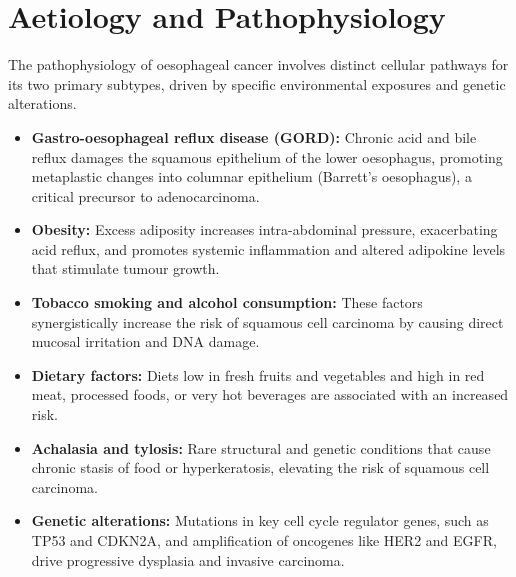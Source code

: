 \section*{Aetiology and Pathophysiology}
The pathophysiology of oesophageal cancer involves distinct cellular pathways for its two primary subtypes, driven by specific environmental exposures and genetic alterations.
\begin{itemize}
    \item \textbf{Gastro-oesophageal reflux disease (GORD):} Chronic acid and bile reflux damages the squamous epithelium of the lower oesophagus, promoting metaplastic changes into columnar epithelium (Barrett's oesophagus), a critical precursor to adenocarcinoma.
    \item \textbf{Obesity:} Excess adiposity increases intra-abdominal pressure, exacerbating acid reflux, and promotes systemic inflammation and altered adipokine levels that stimulate tumour growth.
    \item \textbf{Tobacco smoking and alcohol consumption:} These factors synergistically increase the risk of squamous cell carcinoma by causing direct mucosal irritation and DNA damage.
    \item \textbf{Dietary factors:} Diets low in fresh fruits and vegetables and high in red meat, processed foods, or very hot beverages are associated with an increased risk.
    \item \textbf{Achalasia and tylosis:} Rare structural and genetic conditions that cause chronic stasis of food or hyperkeratosis, elevating the risk of squamous cell carcinoma.
    \item \textbf{Genetic alterations:} Mutations in key cell cycle regulator genes, such as TP53 and CDKN2A, and amplification of oncogenes like HER2 and EGFR, drive progressive dysplasia and invasive carcinoma.
\end{itemize}

